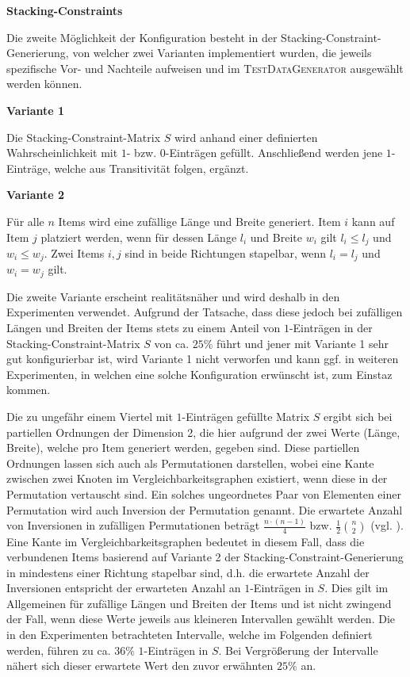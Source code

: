 \pagebreak

\textbf{Stacking-Constraints}

Die zweite Möglichkeit der Konfiguration besteht in der Stacking-Constraint-Generierung,
von welcher zwei Varianten implementiert wurden, die jeweils spezifische Vor- und Nachteile aufweisen
und im \textsc{TestDataGenerator} ausgewählt werden können.

\textbf{Variante 1}

Die Stacking-Constraint-Matrix $S$ wird anhand einer definierten Wahrscheinlichkeit mit $1$- bzw. $0$-Einträgen gefüllt. Anschließend werden jene $1$-Einträge, welche aus Transitivität folgen, ergänzt.

\textbf{Variante 2}

Für alle $n$ Items wird eine zufällige Länge und Breite generiert. Item $i$ kann auf Item $j$
platziert werden, wenn für dessen Länge $l_i$ und Breite $w_i$ gilt $l_i \leq l_j$ und $w_i \leq w_j$.
Zwei Items $i, j$ sind in beide Richtungen stapelbar, wenn $l_i = l_j$ und $w_i = w_j$ gilt.

Die zweite Variante erscheint realitätsnäher und wird deshalb in den Experimenten verwendet.
Aufgrund der Tatsache, dass diese jedoch bei zufälligen Längen und Breiten der Items stets zu einem Anteil
von $1$-Einträgen in der Stacking-Constraint-Matrix $S$ von ca. $25\%$ führt und jener mit Variante 1 sehr gut
konfigurierbar ist, wird Variante 1 nicht verworfen und kann ggf. in weiteren Experimenten, in welchen eine
solche Konfiguration erwünscht ist, zum Einstaz kommen.

Die zu ungefähr einem Viertel mit $1$-Einträgen gefüllte Matrix $S$ ergibt sich bei partiellen Ordnungen der Dimension 2,
die hier aufgrund der zwei Werte (Länge, Breite), welche pro Item generiert werden, gegeben sind.
Diese partiellen Ordnungen lassen sich auch als Permutationen darstellen, wobei eine Kante zwischen
zwei Knoten im Vergleichbarkeitsgraphen existiert, wenn diese in der Permutation
vertauscht sind. Ein solches ungeordnetes Paar von Elementen einer Permutation wird auch Inversion
der Permutation genannt. Die erwartete Anzahl von Inversionen in zufälligen Permutationen
beträgt $\frac{n \cdot (n - 1)}{4}$ bzw. $\frac{1}{2} \binom{n}{2}$ (vgl. \citet{Heuberger2012}).
Eine Kante im Vergleichbarkeitsgraphen bedeutet in diesem Fall, dass die verbundenen Items
basierend auf Variante 2 der Stacking-Constraint-Generierung in mindestens einer Richtung stapelbar sind,
d.h. die erwartete Anzahl der Inversionen entspricht der erwarteten Anzahl an $1$-Einträgen in $S$.
Dies gilt im Allgemeinen für zufällige Längen und Breiten der Items und ist nicht zwingend der Fall,
wenn diese Werte jeweils aus kleineren Intervallen gewählt werden.
Die in den Experimenten betrachteten Intervalle, welche im Folgenden definiert werden,
führen zu ca. $36\%$ $1$-Einträgen in $S$. Bei Vergrößerung der Intervalle nähert sich dieser
erwartete Wert den zuvor erwähnten $25\%$ an.


